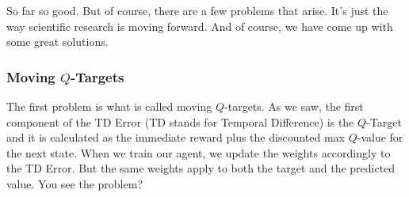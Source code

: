So far so good. But of course, there are a few problems that arise. It's just the way 
scientific research is moving forward. And of course, we have come up with some great 
solutions.

\subsubsection{Moving $Q$-Targets}

The first problem is what is called moving $Q$-targets. As we saw, the first component 
of the TD Error (TD stands for Temporal Difference) is the $Q$-Target and it is calculated 
as the immediate reward plus the discounted max $Q$-value for the next state. When we 
train our agent, we update the weights accordingly to the TD Error. But the same weights 
apply to both the target and the predicted value. You see the problem?

